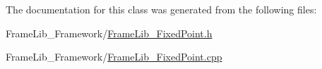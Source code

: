 The documentation for this class was generated from the following files\+:\begin{DoxyCompactItemize}
\item 
Frame\+Lib\+\_\+\+Framework/\hyperlink{_frame_lib___fixed_point_8h}{Frame\+Lib\+\_\+\+Fixed\+Point.\+h}\item 
Frame\+Lib\+\_\+\+Framework/\hyperlink{_frame_lib___fixed_point_8cpp}{Frame\+Lib\+\_\+\+Fixed\+Point.\+cpp}\end{DoxyCompactItemize}
